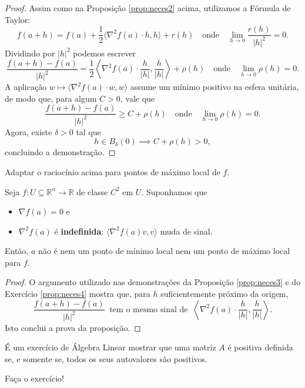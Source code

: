 \begin{proof}
	Assim como na Proposição \ref{prop:neces2} acima, utilizamos a Fórmula de Taylor:
	\[
	f(a + h) = f(a) + \frac{1}{2} \langle \nabla^2 f (a) \cdot h, h \rangle + r(h)  \quad \text{onde} \quad \lim_{h \to 0} \frac{r(h)}{|h|^2} = 0.
	\] Dividindo por $|h|^2$ podemos escrever
	\[
	\frac{f(a + h) - f(a)}{|h|^2} = \frac{1}{2} \left\langle \nabla^2 f (a) \cdot \frac{h}{|h|}, \frac{h}{|h|} \right\rangle + \rho(h)  \quad \text{onde} \quad \lim_{h \to 0} \rho(h) = 0.
	\] A aplicação $w \mapsto \langle \nabla^2 f (a) \cdot w, w \rangle$ assume um mínimo positivo na esfera unitária, de modo que, para algum $C>0$, vale que
	\[
	\frac{f(a + h) - f(a)}{|h|^2} \ge C + \rho(h)  \quad \text{onde} \quad \lim_{h \to 0} \rho(h) = 0.
	\]
	Agora, existe $\delta >0$ tal que
	\[
	h \in B_{\delta}(0) \implies C + \rho(h) > 0,
	\] concluindo a demonstração.
\end{proof}


\begin{exer}\label{prop:neces4}
	Adaptar o raciocínio acima para pontos de máximo local de $f$.
\end{exer}


\begin{prop}
	Seja $f: U \subseteq \mathbb{R}^n \to \mathbb{R}$ de classe $C^2$ em $U$. Suponhamos que
	\begin{itemize}
		\item $\nabla f (a) = 0$ e
		
		\item $\nabla^2 f(a)$ é \textbf{indefinida}: $\langle \nabla^2 f(a) v, v \rangle$ muda de sinal.
	\end{itemize} Então, $a$ não é nem um ponto de mínimo local nem um ponto de máximo local para $f$.
\end{prop}

\begin{proof}
	O argumento utilizado nas demonstrações da Proposição \ref{prop:neces3} e do Exercício \ref{prop:neces4} mostra que, para $h$ suficientemente próximo da origem,
	\[
	\frac{f(a + h) - f(a)}{|h|^2} \ \text{ tem o mesmo sinal de }\ \left\langle \nabla^2 f (a) \cdot \frac{h}{|h|}, \frac{h}{|h|} \right\rangle.
	\] Isto conclui a prova da proposição.
\end{proof}


É um exercício de Álgebra Linear mostrar que uma matriz $A$ é positiva definida se, e somente se, todos os seus autovalores são positivos.

\begin{exer}
	Faça o exercício!
\end{exer}

